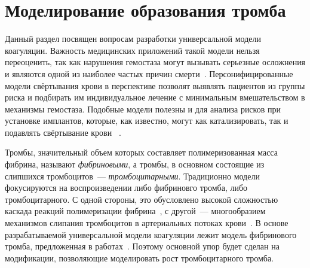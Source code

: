 \chapter{Моделирование образования тромба}
\label{chapter:blood} 

Данный раздел посвящен вопросам разработки универсальной модели коагуляции.
Важность медицинских приложений такой модели нельзя переоценить,
так как нарушения гемостаза могут вызывать серьезные осложнения
и являются одной из наиболее частых причин смерти~\cite{geoffrey2008stroke, jackson2011arterial_thrombosis, who2020global_health_estimates}.
Персонифицированные модели свёртывания крови в перспективе позволят выявлять пациентов из группы риска
и подбирать им индивидуальное лечение с минимальным вмешательством в механизмы гемостаза.
Подобные модели полезны и для анализа рисков при установке имплантов,
которые, как известно, могут как катализировать, так и подавлять свёртывание крови%
~\cite{rasche2001haemostasis_overview, bluestein2002mechanical_heart_valves_thrombosis, slepian2017shear-induced_platelet_activation, consolo2019shear-mediated_platelet_activation}.


Тромбы, значительный объем которых составляет полимеризованная масса фибрина,
называют \emph{фибриновыми}, а тромбы, в основном состоящие из слипшихся тромбоцитов~--- \emph{тромбоцитарными}.
Традиционно модели фокусируются на воспроизведении либо фибриновго тромба, либо тромбоцитарного.
С одной стороны, это обусловлено высокой сложностью каскада реакций полимеризации фибрина~\cite{rasche2001haemostasis_overview, bouchnita2020mathematical},
с другой~--- многообразием механизмов слипания тромбоцитов в артериальных потоках крови~\cite{savage1996platelet_adhesion, rasche2001haemostasis_overview, rahman2019platelet_adhesion}.
В основе разрабатываемой универсальной модели коагуляции лежит модель фибринового тромба,
предложенная в работах~\cite{bouchnita2020mathematical, vassilevski2020parallel}.
Поэтому основной упор будет сделан на модификации,
позволяющие моделировать рост тромбоцитарного тромба.

